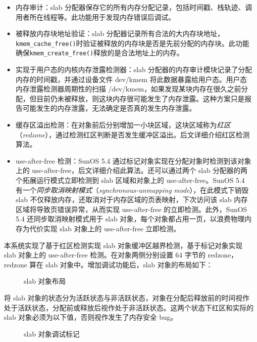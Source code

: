 \documentclass[AutoFakeBold]{LZUThesis}
\begin{document}
\begin{sloppypar}
\begin{itemize}
\item
  内存审计：slab
  分配器保存它的所有内存分配记录，包括时间戳、栈轨迹、调用者所在线程等。此功能用于发现内存错误后调试。
\item
  被释放内存块地址验证：slab
  分配器记录所有合法的大内存块地址，\texttt{kmem\_cache\_free()}时验证被释放的内存块是否是先前分配的内存块。此功能确保\texttt{kmem\_create\_free()}释放的是合法地址上的内存。
\item
  实现于用户态的内核内存泄露检测器：slab
  分配器的内存审计模块记录了分配内存的时间戳，并通过设备文件 dev/kmem
  将此数据暴露给用户态。用户态内存泄露检测器周期性的扫描
  /dev/kmem，如果发现某块内存在很久之前分配，但目前仍未被释放，则这块内存很可能发生了内存泄露。这种方案只是报告可能发生的内存泄露，无法确定是否真的发生内存泄露。
\item
  缓存区溢出检测：在对象前后分别增加一小块区域，这块区域称为\emph{红区}（\emph{redzone}），通过检测红区判断是否发生缓冲区溢出。后文详细介绍红区检测算法。
\item
  use-after-free 检测：SunOS 5.4
  通过标记对象实现在分配对象时检测到该对象上的
  use-after-free，后文详细介绍此算法。还可以通过两个 slab
  分配器的两个拓展运行模式立即检测到 slab 区域和对象上的
  use-after-free。SunOS 5.4
  有一个\emph{同步取消映射模式}（\emph{synchronous-unmapping
  mode}），在此模式下销毁 slab
  不仅释放内存，还取消对于内存区域的页表映射，下次访问该 slab
  内存区域将导致页错误异常，从而实现 use-after-free
  的立即检测。此外，SunOS 5.4 还同步取消映射模式用于 slab
  对象，每个对象都占用一页，以浪费物理内存为代价实现 slab 对象上的
  use-after-free 立即检测。
\end{itemize}

本系统实现了基于红区检测实现 slab 对象缓冲区越界检测，基于标记对象实现
slab 对象上的 use-after-free 检测。在对象两侧分别设置 64 字节的
redzone，redzone 算在 slab 对象中。增加调试功能后，slab 对象的布局如下：

\begin{figure}
\centering

\caption{slab 对象布局}
\end{figure}

将 slab
对象的状态分为活跃状态与非活跃状态，对象在分配后释放前的时间视作处于活跃状态，分配前或释放后视作处于非活跃状态。这两个状态下红区和实际的
slab 对象必须为以下值，否则视作发生了内存安全 bug。

\begin{figure}
\centering

\caption{slab 对象调试标记}
\end{figure}


\end{sloppypar}
\end{document}
